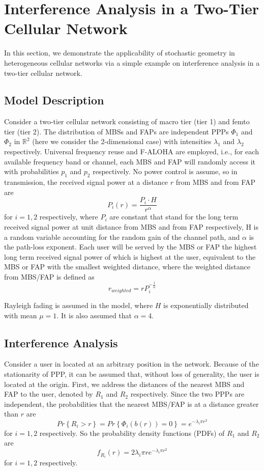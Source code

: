 \documentclass[a4paper,twocolumn]{IEEEtran}
\begin{document}
\section{Interference Analysis in a Two-Tier Cellular Network}\label{Sec:Int}
In this section, we demonstrate the applicability of stochastic geometry in heterogeneous cellular networks via a simple example on interference analysis in a two-tier cellular network.
\subsection{Model Description}
Consider a two-tier cellular network consisting of macro tier (tier 1) and femto tier (tier 2). The distribution of MBSs and FAPs are independent PPPs $\Phi_1$ and $\Phi_2$ in $\mathbb{R}^2$ (here we consider the 2-dimensional case) with intensities $\lambda_1$ and $\lambda_2$ respectively. Universal frequency reuse and F-ALOHA are employed, i.e., for each available frequency band or channel, each MBS and FAP will randomly access it with probabilities $p_1$ and $p_2$ respectively. No power control is assume, so in transmission, the received signal power at a distance $r$ from MBS and from FAP are
\begin{equation}
P_i(r)=\frac{P_i \cdot H}{r^\alpha} 
\end{equation}
for $i=1, 2$ respectively, where $P_i$ are constant that stand for the long term received signal power at unit distance from MBS and from FAP respectively, H is a random variable accounting for the random gain of the channel path, and $\alpha$ is the path-loss exponent. Each user will be served by the MBS or FAP the highest long term received signal power of which is highest at the user, equivalent to the MBS or FAP with the smallest weighted distance, where the weighted distance from MBS/FAP is defined as
\begin{equation}
r_{weighted}=r{P_i^{-\frac{1}{\alpha}}}
\end{equation}

Rayleigh fading is assumed in the model, where $H$ is exponentially distributed with mean $\mu = 1$. It is also assumed that $\alpha = 4$.
\subsection{Interference Analysis}
Consider a user in located at an arbitrary position in the network. Because of the stationarity of PPP, it can be assumed that, without loss of generality, the user is located at the origin.
First, we address the distances of the nearest MBS and FAP to the user, denoted by $R_1$ and $R_2$ respectively. Since the two PPPs are independent, the probabilities that the nearest MBS/FAP is at a distance greater than $r$ are
\begin{displaymath}
Pr\left\lbrace R_i > r \right\rbrace = Pr\left\lbrace \Phi_i(b(r))=0\right\rbrace = e^{-\lambda_i \pi r^2}
\end{displaymath}
for $i=1,2$ respectively. So the probability density functions (PDFs) of $R_1$ and $R_2$ are
\begin{equation}
f_{R_i}(r) = 2\lambda_i \pi r e^{-\lambda_i \pi r^2}
\end{equation}
for $i=1,2$ respectively.   
\end{document}
